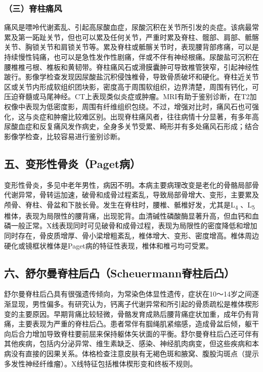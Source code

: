 \subsubsection{（三）脊柱痛风}

痛风是嘌呤代谢紊乱、引起高尿酸血症，尿酸沉积在关节所引发的炎症。该病最常累及第一跖趾关节，但也可以累及任何关节，严重时累及脊柱、髋部、肩部、骶髂关节、胸锁关节和肩锁关节等。累及脊柱或骶髂关节时，表现腰背部疼痛，可以是持续慢性钝痛，也可以是急性发作性剧痛，伴或不伴有神经根痛。尿酸盐可沉积在腰椎椎弓根、椎板和黄韧带。脊柱痛风石或滑膜囊肿可导致椎管狭窄，引起神经性跛行。影像学检查发现因尿酸盐沉积侵蚀椎骨，导致骨质破坏和硬化。脊柱近关节区或关节内形成软组织团块影，密度高于周围软组织，边界清楚，周围有钙化，可压迫脊髓或马尾神经。CT上表现类似炎症或肿瘤。MRI有助于鉴别诊断，在T2加权像中表现为低密度影，周围有纤维组织包绕。不过，增强对比时，痛风石也可强化，这与炎症和肿瘤比较难区别。出现脊柱痛风者，往往病情十分显著，有多年高尿酸血症和反复痛风发作病史，全身多关节受累、畸形并有多处痛风石形成；结合影像学检查，比较容易进行鉴别诊断。

\subsection{五、变形性骨炎（Paget病）}

变形性骨炎，多见中老年男性，病因不明。本病主要病理改变是老化的骨骼局部骨代谢异常，骨转运加速，破骨和成骨过程紊乱，导致局部骨增大、变形，主要累及颅骨、脊柱、骨盆和下肢长骨。发生在脊柱时，腰椎、骶椎好发，尤其是L\textsubscript{4}
、L\textsubscript{5}
椎体，表现为局限性的腰背痛，出现驼背。血清碱性磷酸酶显著升高，但血钙和血磷一般正常。X线表现同时可见破骨和成骨过程，表现为局限性的密度降低和增加同时存在，骨皮质增厚、骨小梁增粗紊乱，椎体增大、变形、密度增高。椎体周边硬化或镜框状椎体是Paget病的特征性表现，椎体和椎弓均可受累。

\subsection{六、舒尔曼脊柱后凸（Scheuermann脊柱后凸）}

舒尔曼脊柱后凸具有很强遗传倾向，为常染色体显性遗传，症状在10～14岁之间逐渐显现，男性偏多。有研究认为，钙离子代谢异常和所引起的骨质疏松是椎体楔形变的主要原因。早期背痛比较轻微，骨骼发育成熟后腰背痛症状加重，成年仍有背痛，主要表现为严重的脊柱后凸。患者常伴有腘绳肌紧缩感，造成骨盆后倾，躯干向后合力增加导致脊柱要前屈来保持躯体矢状面的平衡。舒尔曼脊柱后凸还可伴有其他疾病，包括内分泌异常、维生素缺乏、感染、神经肌肉病变，但这些疾病和本病没有直接的因果关系。体格检查注意皮肤有无褐色斑和腋窝、腹股沟斑点（提示多发性神经纤维瘤）。X线特征包括椎体楔形变和终板不规则。

